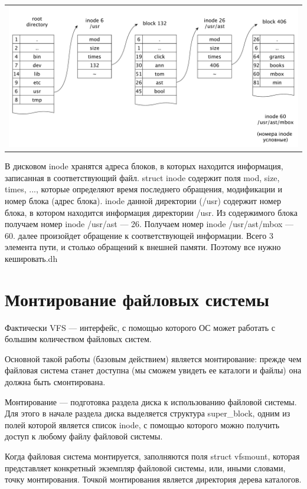 \begin{table}[h!]
  \centering
  \begin{tabular}{p{1\linewidth}}
    \centering
    \includegraphics[width=0.8\linewidth]{./images/mbox.pdf}
  \end{tabular}
\end{table}

В дисковом inode хранятся адреса блоков, в которых находится информация, записанная в соответствующий файл. struct inode содержит поля mod, size, times, ..., которые определяют время последнего обращения, модификации и номер блока (адрес блока). inode данной директории (/usr) содержит номер блока, в котором находится информация директории /usr. Из содержимого блока получаем номер inode /usr/ast --- 26. Получаем номер inode /usr/ast/mbox --- 60. далее произойдет обращение к соответствующей информации. Всего 3 элемента пути, и столько обращений к внешней памяти. Поэтому все нужно кешировать.dh

\section{Монтирование файловых системы}

Фактически VFS — интерфейс, с помощью которого ОС может работать с большим количеством файловых систем.

Основной такой работы (базовым действием) является монтирование: прежде чем файловая система станет доступна (мы сможем увидеть ее каталоги и файлы) она должна быть смонтирована.

Монтирование — подготовка раздела диска к использованию файловой системы. Для этого в начале раздела диска выделяется структура super\_block, одним из полей которой является список inode, с помощью которого можно получить доступ к любому файлу файловой системы.

Когда файловая система монтируется, заполняются поля struct vfsmount, которая представляет конкретный экземпляр файловой системы, или, иными словами, точку монтирования. Точкой монтирования является директория дерева каталогов.

